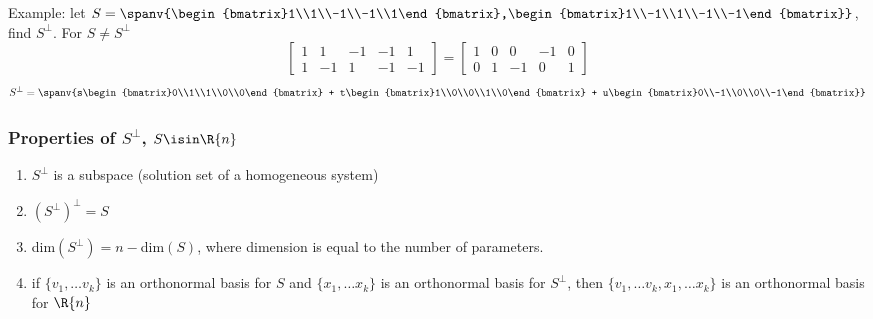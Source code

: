 \documentclass[12pt]{article}
\begin{document}
Example: let $S = \spanv{\begin{bmatrix}1\\1\\-1\\-1\\1\end{bmatrix},\begin{bmatrix}1\\-1\\1\\-1\\-1\end{bmatrix}}$, find $S^\perp$. For $S \neq S^\perp$ \[ \begin{bmatrix}1&1&-1&-1&1\\1&-1&1&-1&-1\end{bmatrix} = \begin{bmatrix}1&0&0&-1&0\\0&1&-1&0&1\end{bmatrix} \] \[ S^\perp = \spanv{s\begin{bmatrix}0\\1\\1\\0\\0\end{bmatrix} + t\begin{bmatrix}1\\0\\0\\1\\0\end{bmatrix} + u\begin{bmatrix}0\\-1\\0\\0\\-1\end{bmatrix}} \]

\subsubsection*{Properties of $S^\perp$, $S\isin\R{n}$}
\begin{enumerate}
\item $S^\perp$ is a subspace (solution set of a homogeneous system)
\item $(S^\perp)^\perp = S$
\item dim$(S^\perp) = n - $dim$(S)$, where dimension is equal to the number of parameters.
\item if $\{v_1,\dots v_k\}$ is an orthonormal basis for $S$ and $\{x_1,\dots x_k\}$ is an orthonormal basis for $S^\perp$, then $\{v_1,\dots v_k,x_1,\dots x_k\}$ is an orthonormal basis for $\R{n}$
\end{enumerate}
\end{document}
